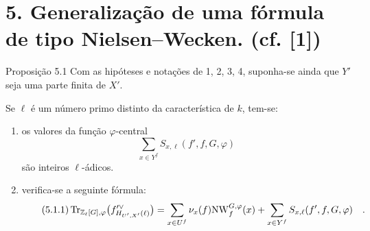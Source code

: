 \section*{5. Generalização de uma fórmula de tipo Nielsen--Wecken. {\normalfont (cf. [1])}}

\begin{statement}{Proposição 5.1}
Com as hipóteses e notações de 1, 2, 3, 4, suponha-se ainda que $Y'$ seja uma parte finita de $X'$.

Se $\ell$ é um número primo distinto da característica de $k$, tem-se:
\begin{enumerate}[label=\alph*)]
\item os valores da função $\varphi$-central
\[
\sum_{x\in Y^f} S_{x,\ell}(f',f,G,\varphi)
\]
são inteiros $\ell$-ádicos.
\item verifica-se a seguinte fórmula:
\begin{equation}\tag{5.1.1}
\operatorname{Tr}_{\mathbb Z_\ell[G],\varphi}\bigl(f'^\vee_{H_{U',X'}(\ell)}\bigr)
= \sum_{x\in U^f}\nu_x(f)\mathrm{NW}^{G,\varphi}_f(x)+\sum_{x\in Y^f}S_{x,\ell}(f',f,G,\varphi) \quad .
\end{equation}
\end{enumerate}
\end{statement}
